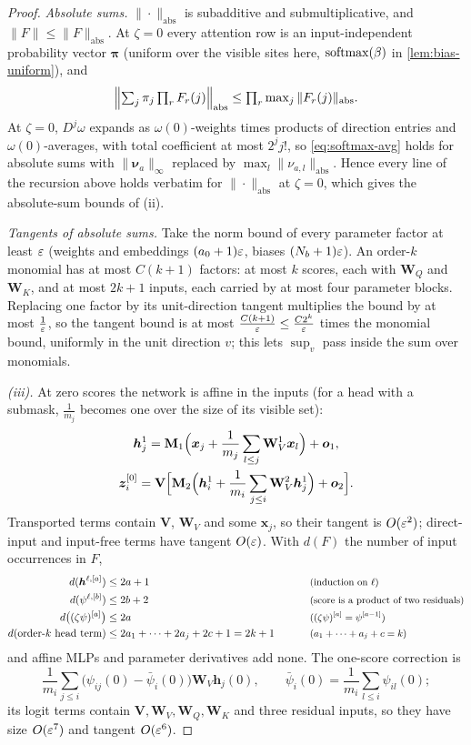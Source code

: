 \begin{proof}
\emph{Absolute sums.} $\|\cdot\|_{\mathrm{abs}}$ is subadditive and submultiplicative, and $\|F\|\le\|F\|_{\mathrm{abs}}$. At $\zeta=0$ every attention row is an
input-independent probability vector $\bm\pi$ (uniform over the visible sites here, $\operatorname{softmax}(\beta)$ in \cref{lem:bias-uniform}), and
\[
 \Bigl\|\textstyle\sum_j\pi_j\prod_rF_r(j)\Bigr\|_{\mathrm{abs}}\le\prod_r\max_j\|F_r(j)\|_{\mathrm{abs}} .
\]
At $\zeta=0$, $D^j\omega$ expands as $\omega(0)$-weights times products of direction entries and $\omega(0)$-averages, with total coefficient at most $2^jj!$,
so \cref{eq:softmax-avg} holds for absolute sums with $\|\bm\nu_a\|_\infty$ replaced by $\max_l\|\nu_{a,l}\|_{\mathrm{abs}}$. Hence every line of the recursion
above holds verbatim for $\|\cdot\|_{\mathrm{abs}}$ at $\zeta=0$, which gives the absolute-sum bounds of (ii).

\emph{Tangents of absolute sums.} Take the norm bound of every parameter factor at least $\varepsilon$ (weights and embeddings $(a_0+1)\varepsilon$,
biases $(N_b+1)\varepsilon$). An order-$k$ monomial has at most $C(k+1)$ factors: at most $k$ scores, each with $\mathbf W_Q$ and $\mathbf W_K$, and at
most $2k+1$ inputs, each carried by at most four parameter blocks. Replacing one factor by its unit-direction tangent multiplies the bound by at
most $\frac{1}{\varepsilon}$, so the tangent bound is at most $\frac{C(k+1)}{\varepsilon}\le\frac{C2^k}{\varepsilon}$ times the monomial bound, uniformly in the unit direction
$v$; this lets $\sup_v$ pass inside the sum over monomials.

\emph{(iii).} At zero scores the network is affine in the inputs (for a head with a submask, $\frac{1}{m_j}$ becomes one over the size of its
visible set):
\begin{gather*}
 \bm h^1_j=\mathbf M_1\Bigl(\bm x_j+\frac{1}{m_j}\sum_{l\le j}\mathbf W^1_V\bm x_l\Bigr)+\bm o_1,\\
 \bm z^{[0]}_i=\mathbf V\Bigl[\mathbf M_2\Bigl(\bm h^1_i+\frac{1}{m_i}\sum_{j\le i}\mathbf W^2_V\bm h^1_j\Bigr)+\bm o_2\Bigr].
\end{gather*}
Transported terms contain $\mathbf V$, $\mathbf W_V$ and some $\bm x_j$, so their tangent is $O(\varepsilon^2)$; direct-input and input-free terms have tangent $O(\varepsilon)$.
With $d(F)$ the number of input occurrences in $F$,
\begin{alignat*}{2}
 d(\bm h^{\ell,[a]})&\le2a+1 &\qquad& \why{induction on $\ell$}\\
 d(\psi^{\ell,[b]})&\le2b+2 && \why{score is a product of two residuals}\\
 d\bigl((\zeta\psi)^{[a]}\bigr)&\le2a && \why{$(\zeta\psi)^{[a]}=\psi^{[a-1]}$}\\
 d(\text{order-$k$ head term})&\le2a_1+\cdots+2a_j+2c+1=2k+1 && \why{$a_1+\cdots+a_j+c=k$}
\end{alignat*}
and affine MLPs and parameter derivatives add none. The one-score correction is
\[
 \frac{1}{m_i}\sum_{j\le i}\bigl(\psi_{ij}(0)-\bar\psi_i(0)\bigr)\mathbf W_V\bm h_j(0),\qquad \bar\psi_i(0)=\frac{1}{m_i}\sum_{l\le i}\psi_{il}(0);
\]
its logit terms contain $\mathbf V,\mathbf W_V,\mathbf W_Q,\mathbf W_K$ and three residual inputs, so they have size $O(\varepsilon^7)$ and tangent $O(\varepsilon^6)$.


\end{proof}
